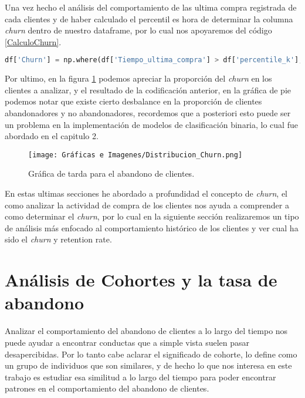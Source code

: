 Una vez hecho el análisis del comportamiento de las ultima compra registrada de cada clientes y de haber calculado el percentil es hora de determinar la columna \textit{churn} dentro de nuestro dataframe, por lo cual nos apoyaremos del código \ref{CalculoChurn}.

\begin{lstlisting}[language=Python, caption=Ejemplo de como determinar el churn., label=CalculoChurn]
	df['Churn'] = np.where(df['Tiempo_ultima_compra'] > df['percentile_k'],True, False)
\end{lstlisting}

Por ultimo, en la figura \ref{fig:ChurnDistri} podemos apreciar la proporción del \textit{churn} en los clientes a analizar, y el resultado de la codificación anterior, en la gráfica de pie podemos notar que existe cierto desbalance en la proporción de clientes abandonadores y no abandonadores, recordemos que a posteriori esto puede ser un problema en la implementación de modelos de clasificación binaria, lo cual fue abordado en el capitulo 2.

\begin{center}
	\begin{figure}[H]
		\centering
		\texttt{[image: Gráficas e Imagenes/Distribucion\_Churn.png]}
		\caption{Gráfica de tarda para el abandono de clientes.}
		\label{fig:ChurnDistri}
	\end{figure}
\end{center}

En estas ultimas secciones he abordado a profundidad el concepto de \textit{churn}, el como analizar la actividad de compra de los clientes nos ayuda a comprender a como determinar el \textit{churn}, por lo cual en la siguiente sección realizaremos un tipo de análisis más enfocado al comportamiento histórico de los clientes y ver cual ha sido el \textit{churn} y retention rate.

\section{Análisis de Cohortes y la tasa de abandono}

Analizar el comportamiento del abandono de clientes a lo largo del tiempo nos puede ayudar a encontrar conductas que a simple vista suelen pasar desapercibidas. Por lo tanto cabe aclarar el significado de cohorte,  \citep{2020Gold} lo define como un grupo de individuos que son similares, y de hecho lo que nos interesa en este trabajo es estudiar esa similitud a lo largo del tiempo para poder encontrar patrones en el comportamiento del abandono de clientes. 


